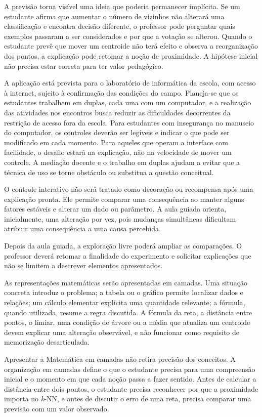 A previsão torna visível uma ideia que poderia permanecer implícita. Se um estudante afirma que aumentar o número de vizinhos não alterará uma classificação e encontra decisão diferente, o professor pode perguntar quais exemplos passaram a ser considerados e por que a votação se alterou. Quando o estudante prevê que mover um centroide não terá efeito e observa a reorganização dos pontos, a explicação pode retomar a noção de proximidade. A hipótese inicial não precisa estar correta para ter valor pedagógico.

A aplicação está prevista para o laboratório de informática da escola, com acesso à internet, sujeito à confirmação das condições do campo. Planeja-se que os estudantes trabalhem em duplas, cada uma com um computador, e a realização das atividades nos encontros busca reduzir as dificuldades decorrentes da restrição de acesso fora da escola. Para estudantes com insegurança no manuseio do computador, os controles deverão ser legíveis e indicar o que pode ser modificado em cada momento. Para aqueles que operam a interface com facilidade, o desafio estará na explicação, não na velocidade de mover um controle. A mediação docente e o trabalho em duplas ajudam a evitar que a técnica de uso se torne obstáculo ou substitua a questão conceitual.

O controle interativo não será tratado como decoração ou recompensa após uma explicação pronta. Ele permite comparar uma consequência ao manter alguns fatores estáveis e alterar um dado ou parâmetro. A aula guiada orienta, inicialmente, uma alteração por vez, pois mudanças simultâneas dificultam atribuir uma consequência a uma causa percebida.

Depois da aula guiada, a exploração livre poderá ampliar as comparações. O professor deverá retomar a finalidade do experimento e solicitar explicações que não se limitem a descrever elementos apresentados.

As representações matemáticas serão apresentadas em camadas. Uma situação concreta introduz o problema; a tabela ou o gráfico permite localizar dados e relações; um cálculo elementar explicita uma quantidade relevante; a fórmula, quando utilizada, resume a regra discutida. A fórmula da reta, a distância entre pontos, o limiar, uma condição de árvore ou a média que atualiza um centroide devem explicar uma alteração observável, e não funcionar como requisito de memorização desarticulada.

Apresentar a Matemática em camadas não retira precisão dos conceitos. A organização em camadas define o que o estudante precisa para uma compreensão inicial e o momento em que cada noção passa a fazer sentido. Antes de calcular a distância entre dois pontos, o estudante precisa reconhecer por que a proximidade importa no \textit{k}-NN, e antes de discutir o erro de uma reta, precisa comparar uma previsão com um valor observado.

